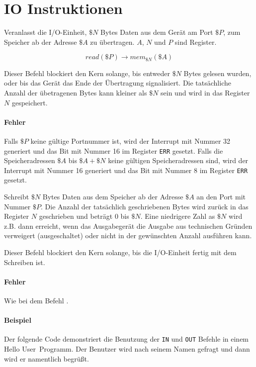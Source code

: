 \section{IO Instruktionen}
\label{sec:IO-Instruktionen}




Veranlasst die I/O-Einheit, $\$N$ Bytes Daten aus dem Gerät am Port $\$P$, zum
Speicher ab der Adresse $\$A$ zu übertragen. $A$, $N$ und $P$ sind Register.

\[
  read(\$P) \to mem_{\$N}(\$A)
\]

Dieser Befehl blockiert den Kern solange, bis entweder $\$N$ Bytes gelesen
wurden, oder bis das Gerät das Ende der Übertragung signalisiert. Die
tatsächliche Anzahl der übetragenen Bytes kann kleiner als $\$N$ sein und wird
in das Register $N$ gespeichert.


\paragraph{Fehler}
Falls $\$P$ keine gültige Portnummer ist, wird der Interrupt mit Nummer 32
generiert und das Bit mit Nummer 16 im Register \texttt{ERR} gesetzt.
Falls die Speicheradressen $\$A$ bis $\$A + \$N$ keine gültigen Speicheradressen
sind, wird der Interrupt mit Nummer 16
generiert und das Bit mit Nummer 8 im Register \texttt{ERR} gesetzt.


Schreibt $\$N$ Bytes Daten aus dem Speicher ab der Adresse $\$A$ an den Port mit
Nummer $\$P$. Die Anzahl der tatsächlich geschriebenen Bytes wird zurück in das
Register $N$ geschrieben und beträgt $0$ bis $\$N$. Eine niedrigere Zahl
as $\$N$ wird z.B. dann erreicht, wenn das Ausgabegerät die Ausgabe aus
technischen Gründen verweigert (ausgeschaltet) oder nicht in der gewünschten
Anzahl ausführen kann.

Dieser Befehl blockiert den Kern solange, bis die I/O-Einheit fertig mit dem
Schreiben ist.

\paragraph{Fehler}
Wie bei dem Befehl .


\paragraph{Beispiel}
Der folgende Code demonstriert die Benutzung der \texttt{IN} und \texttt{OUT}
Befehle in einem \glqq Hello User\grqq\ Programm. Der Benutzer wird nach seinem
Namen gefragt und dann wird er namentlich begrüßt.

